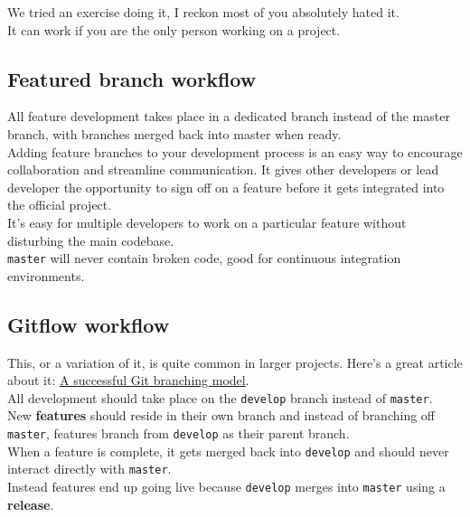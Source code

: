 We tried an exercise doing it, I reckon most of you absolutely hated it. 
\\

It can work if you are the only person working on a project. 


\subsection{Featured branch workflow}

All feature development takes place in a dedicated branch instead of the master branch, with branches merged back into master when ready.
\\

Adding feature branches to your development process is an easy way to encourage collaboration and streamline communication. It gives other developers or lead developer the opportunity to sign off on a feature before it gets integrated into the official project.
\\

It's easy for multiple developers to work on a particular feature without disturbing the main codebase.
\\

\texttt{master} will never contain broken code, good for continuous integration environments.


\subsection{Gitflow workflow}

This, or a variation of it, is quite common in larger projects. Here's a great article about it: \href{https://nvie.com/posts/a-successful-git-branching-model/}{A successful Git branching model}.
\\

All development should take place on the \texttt{develop} branch instead of \texttt{master}.
\\

New \textbf{features} should reside in their own branch and instead of branching off \texttt{master}, features branch from \texttt{develop} as their parent branch.
\\

When a feature is complete, it gets merged back into \texttt{develop} and should never interact directly with \texttt{master}.
\\

Instead features end up going live because \texttt{develop} merges into \texttt{master} using a \textbf{release}.

